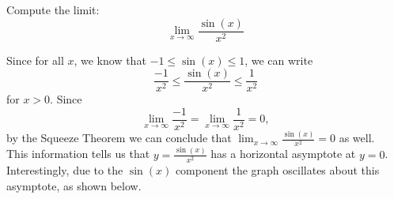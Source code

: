 \documentclass{ximera}
\begin{document}
\begin{example}
	Compute the limit: 
	\[ \lim_{x \to \infty } \frac{ \sin(x)}{x^2} \]
	\begin{explanation}
	Since for all $x$, we know that $-1\leq\sin(x)\leq 1$, we can write
	\[ \frac{-1}{x^2}\leq\frac{\sin(x)}{x^2}\leq\frac{1}{x^2}\]
	for $x>0$. Since 
	\[\lim_{x \to \infty } \frac{-1}{x^2}=\lim_{x \to \infty } \frac{1}{x^2}=0,\]
	by the Squeeze Theorem we can conclude that  \(\lim_{x \to \infty } \frac{ \sin(x)}{x^2}=0\) as well.
	\\This information tells us that $y=\frac{\sin(x)}{x^2}$ has a horizontal asymptote at $y=0$. Interestingly, due to the $\sin(x)$ component the graph oscillates about this asymptote, as shown below.
	
\begin{center}	\end{center}
	
	\end{explanation}
\end{example}
\end{document}
